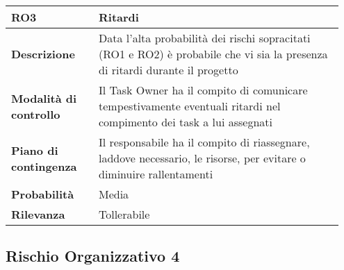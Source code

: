 \begin{table}[H]
    \bgroup
    \def\arraystretch{1.5}
    \begin{tabular} {
            | p{0.25\linewidth} | p{0.70\linewidth} |
        }
        \hline
        \textbf{RO3}                   & \textbf{Ritardi}                                                                                                             \\
        \hline
        \textbf{Descrizione}           & Data l’alta probabilità dei rischi sopracitati (RO1 e RO2) è probabile che vi sia la presenza di ritardi durante il progetto \\
        \hline
        \textbf{Modalità di controllo} & Il Task Owner ha il compito di comunicare tempestivamente eventuali ritardi nel compimento dei task a lui assegnati          \\
        \hline
        \textbf{Piano di contingenza}  & Il responsabile ha il compito di riassegnare, laddove necessario, le risorse, per evitare o diminuire rallentamenti          \\
        \hline
        \textbf{Probabilità}           & Media                                                                                                                        \\
        \hline
        \textbf{Rilevanza}             & Tollerabile                                                                                                                  \\
        \hline
    \end{tabular}
    \egroup
\end{table}

\subsection{Rischio Organizzativo 4}

